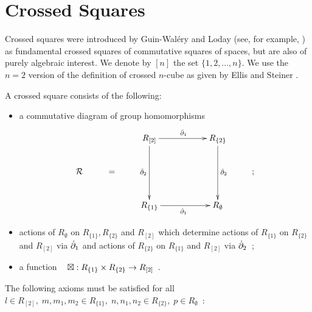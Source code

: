
\section{Crossed Squares} \label{sect:xsq}

Crossed squares were introduced by Guin-Wal\'ery and Loday 
(see, for example, \cite{walery:loday,loday1,brow:lod})
as fundamental crossed squares of commutative squares of spaces,
but are also of purely algebraic interest.
We denote by $[n]$ the set $\{1,2,\ldots,n\}$.
We use the $n=2$ version of the definition of crossed $n$-cube
as given by Ellis and Steiner \cite{ell:st}.

\begin{defn} \label{def:xsq}  
A crossed square consists of the following:
\begin{itemize}
\item
a commutative diagram of group homomorphisms
\begin{equation} \label{eq:Rsquare}
\vcenter{\xymatrix{
       &   &  R_{[2]} \ar[rr]^{\ddbdyo} \ar[dd]_{\ddbdyt} 
              && R_{\{2\}} \ar[dd]^{\dbdyt} &   \\
\calR  & = &  &&                 & ; \\
       &   &  R_{\{1\}} \ar[rr]_{\dbdyo}  
              && R_{\emptyset} 
}} 
\end{equation}
\item
actions of $R_{\emptyset}$ on $R_{\{1\}}, R_{\{2\}}$ and $R_{[2]}$ 
which determine actions of 
$R_{\{1\}}$ on $R_{\{2\}}$ and $R_{[2]}$ via $\dot{\partial}_1$ 
and actions of 
$R_{\{2\}}$ on $R_{\{1\}}$ and $R_{[2]}$ via $\dot{\partial}_2$~;
\item
a function ~ $\boxtimes : R_{\{1\}} \times R_{\{2\}} \to R_{[2]}$~.
\end{itemize}
The following axioms must be satisfied for all 
$l \in R_{[2]},\; m,m_1,m_2 \in R_{\{1\}},\; 
n,n_1,n_2 \in R_{\{2\}},\; p \in R_{\emptyset}$~:
\end{defn}
